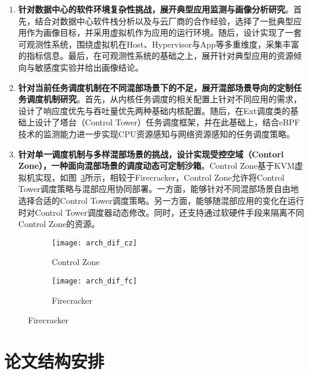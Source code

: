 \begin{enumerate}

    \item \textbf{针对数据中心的软件环境复杂性挑战，展开典型应用监测与画像分析研究}。首先，结合对数据中心软件栈分析以及与云厂商的合作经验，选择了一批典型应用作为画像目标，并采用虚拟机作为应用的运行环境。随后，设计实现了一套可观测性系统，围绕虚拟机在Host、Hypervisor与App等多重维度，采集丰富的指标信息。最后，在可观测性系统的基础之上，展开针对典型应用的资源倾向与敏感度实验并给出画像结论。

    \item \textbf{针对当前任务调度机制在不同混部场景下的不足，展开混部场景导向的定制任务调度机制研究}。首先，从内核任务调度的相关配置上针对不同应用的需求，设计了响应度优先与吞吐量优先两种基础内核配置。随后，在Ext调度类的基础上设计了塔台（Control Tower）任务调度框架，并在此基础上，结合eBPF技术的监测能力进一步实现CPU资源感知与网络资源感知的任务调度策略。

    \item \textbf{针对单一调度机制与多样混部场景的挑战，设计实现受控空域（Contorl Zone），一种面向混部场景的调度动态可定制沙箱}。Control Zone基于KVM虚拟机实现，如图~\ref{fig:arch_dif}所示，相较于Firecracker\citep{agache2020firecracker}，Control Zone允许将Control Tower调度策略与混部应用协同部署。一方面，能够针对不同混部场景自由地选择合适的Control Tower调度策略。另一方面，能够随混部应用的变化在运行时对Control Tower调度器动态修改。同时，还支持通过软硬件手段来隔离不同Control Zone的资源。

\end{enumerate}

\begin{figure}[!htbp]
    \centering
    \begin{subfigure}[b]{0.4\textwidth}
        \texttt{[image: arch\_dif\_cz]}
        \caption{Control Zone}
        \label{fig:arch_dif_cz}
    \end{subfigure}
    \hspace{0.5cm}
    \begin{subfigure}[b]{0.4\textwidth}
        \texttt{[image: arch\_dif\_fc]}
        \caption{Firecracker}
        \label{fig:arch_dif_fc}
    \end{subfigure}
\label{fig:arch_dif}
\end{figure}

\section{论文结构安排}

